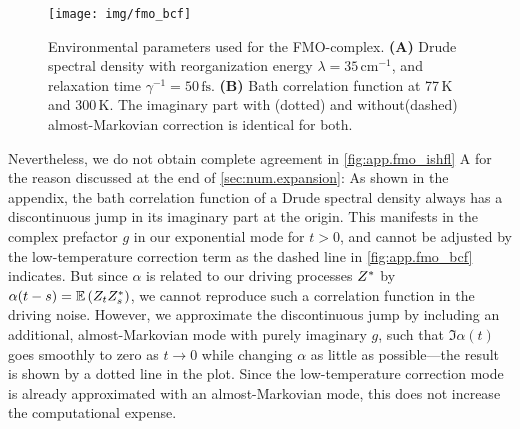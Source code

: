   \begin{figure}
    \centering
    \texttt{[image: img/fmo\_bcf]}
    \caption{%
      Environmental parameters used for the FMO-complex.
      \textbf{(A)} Drude spectral density with reorganization energy $\lambda = 35\,\mathrm{cm^{-1}}$, and relaxation time $\gamma^{-1} = 50\,\mathrm{fs}$.
      \textbf{(B)} Bath correlation function at 77\,K and 300\,K.
      The imaginary part with (dotted) and without(dashed) almost-Markovian correction is identical for both.
    }
    \label{fig:app.fmo_bcf}
  \end{figure}

Nevertheless, we do not obtain complete agreement in \autoref{fig:app.fmo_ishfl} A for the reason discussed at the end of \autoref{sec:num.expansion}:
As shown in the appendix, the bath correlation function of a Drude spectral density always has a discontinuous jump in its imaginary part at the origin.
This manifests in the complex prefactor $g$ in our exponential mode for $t > 0$, and cannot be adjusted by the low-temperature correction term as the dashed line in \autoref{fig:app.fmo_bcf} indicates.
But since $\alpha$ is related to our driving processes ${Z}^*$ by $\alpha(t-s) = \E[Z_t \ZZ_s]$, we cannot reproduce such a correlation function in the driving noise.
However, we approximate the discontinuous jump by including an additional, almost-Markovian mode with purely imaginary $g$, such that $\Im\alpha(t)$ goes smoothly to zero as $t \to 0$ while changing $\alpha$ as little as possible---the result is shown by a dotted line in the plot.
Since the low-temperature correction mode is already approximated with an almost-Markovian mode, this does not increase the computational expense.\\



